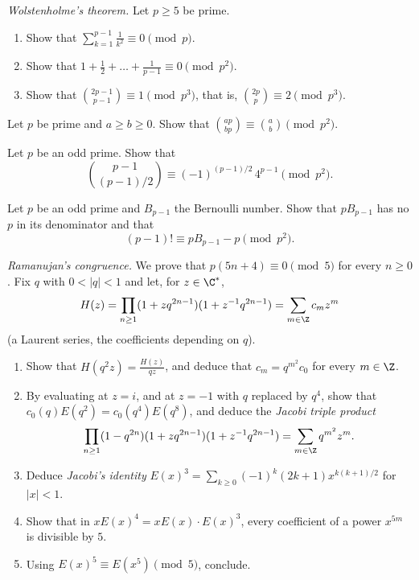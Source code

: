 \begin{exercise}[$\star\star$]\label{pb:wolsten}
\emph{Wolstenholme's theorem.} Let $p\ge5$ be prime.
\begin{enumerate}[label=(\alph*)]
\item Show that $\sum_{k=1}^{p-1}\frac1{k^2}\equiv0\pmod p$.
\item Show that $1+\frac12+\dots+\frac1{p-1}\equiv0\pmod{p^2}$.
\item Show that $\binom{2p-1}{p-1}\equiv1\pmod{p^3}$, that is, $\binom{2p}p\equiv2\pmod{p^3}$.
\end{enumerate}
\end{exercise}

\begin{exercise}[$\star\star$]\label{pb:jacobsthal}
Let $p$ be prime and $a\ge b\ge0$. Show that $\binom{ap}{bp}\equiv\binom ab\pmod{p^2}$.
\end{exercise}

\begin{exercise}[$\star\star$]\label{pb:morley}
Let $p$ be an odd prime. Show that
\[
\binom{p-1}{(p-1)/2}\equiv(-1)^{(p-1)/2}\,4^{p-1}\pmod{p^2}.
\]
\end{exercise}

\begin{exercise}[$\star\star\star$]\label{pb:glaisher}
Let $p$ be an odd prime and $B_{p-1}$ the Bernoulli number. Show that $pB_{p-1}$ has no $p$ in its denominator and that
\[
(p-1)!\equiv pB_{p-1}-p\pmod{p^2}.
\]
\end{exercise}

\begin{exercise}[Journey]\label{pb:ramanujan5}
\emph{Ramanujan's congruence.} We prove that $p(5n+4)\equiv0\pmod5$ for every $n\ge0$. Fix $q$ with $0<|q|<1$ and let, for
$z\in\C^*$,
\[
H(z)=\prod_{n\ge1}(1+zq^{2n-1})(1+z^{-1}q^{2n-1})=\sum_{m\in\Z}c_mz^m
\]
(a Laurent series, the coefficients depending on $q$).
\begin{enumerate}[label=(\alph*)]
\item Show that $H(q^2z)=\frac{H(z)}{qz}$, and deduce that $c_m=q^{m^2}c_0$ for every $m\in\Z$.
\item By evaluating at $z=i$, and at $z=-1$ with $q$ replaced by $q^4$, show that $c_0(q)E(q^2)=c_0(q^4)E(q^8)$, and deduce the
\emph{Jacobi triple product}
\[
\prod_{n\ge1}(1-q^{2n})(1+zq^{2n-1})(1+z^{-1}q^{2n-1})=\sum_{m\in\Z}q^{m^2}z^m.
\]
\item Deduce \emph{Jacobi's identity} $E(x)^3=\sum_{k\ge0}(-1)^k(2k+1)x^{k(k+1)/2}$ for $|x|<1$.
\item Show that in $xE(x)^4=xE(x)\cdot E(x)^3$, every coefficient of a power $x^{5m}$ is divisible by $5$.
\item Using $E(x)^5\equiv E(x^5)\pmod5$, conclude.
\end{enumerate}
\end{exercise}

